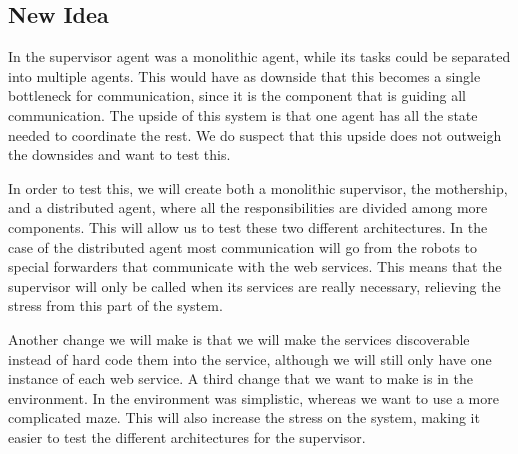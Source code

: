 \subsection{New Idea} 

In \cite{intframe} the supervisor agent was a monolithic agent, while its
tasks could be separated into multiple agents. This would have as downside
that this becomes a single bottleneck for communication, since it is the
component that is guiding all communication. The upside of this system is
that one agent has all the state needed to coordinate the rest. We do
suspect that this upside does not outweigh the downsides and want to test
this.

In order to test this, we will create both a monolithic supervisor, the
mothership, and a distributed agent, where all the responsibilities are
divided among more components. This will allow us to test these two
different architectures. In the case of the distributed agent most
communication will go from the robots to special forwarders that
communicate with the web services. This means that the supervisor will only
be called when its services are really necessary, relieving the stress from
this part of the system. 

Another change we will make is that we will make the services discoverable
instead of hard code them into the service, although we will still only
have one instance of each web service.  A third change that we want to make
is in the environment. In \cite{intframe} the environment was simplistic,
whereas we want to use a more complicated maze. This will also increase the
stress on the system, making it easier to test the different architectures
for the supervisor. 

% 
